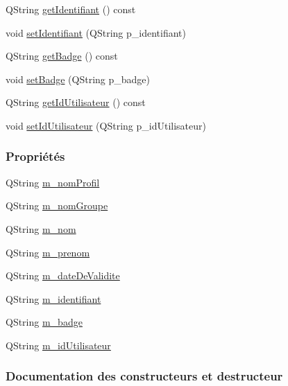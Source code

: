 \begin{DoxyCompactItemize}
\item 
Q\+String \hyperlink{class_utilisateur_armoire_a1ba08f24dedbe82671ae4e2930748f31}{get\+Identifiant} () const
\item 
void \hyperlink{class_utilisateur_armoire_ad1ebf69b10f99b062631a92a3f0ebd2b}{set\+Identifiant} (Q\+String p\+\_\+identifiant)
\item 
Q\+String \hyperlink{class_utilisateur_armoire_a22e301861ac1c932d47727ae02a17181}{get\+Badge} () const
\item 
void \hyperlink{class_utilisateur_armoire_afee7add8e43ae142c815f0d14491b01e}{set\+Badge} (Q\+String p\+\_\+badge)
\item 
Q\+String \hyperlink{class_utilisateur_armoire_a6a37ddd972e4de9db1cf3b4caa1d1755}{get\+Id\+Utilisateur} () const
\item 
void \hyperlink{class_utilisateur_armoire_a51fa6e41f395f6bbe1c3b763eaa93dee}{set\+Id\+Utilisateur} (Q\+String p\+\_\+id\+Utilisateur)
\end{DoxyCompactItemize}
\subsubsection*{Propriétés}
\begin{DoxyCompactItemize}
\item 
Q\+String \hyperlink{class_utilisateur_armoire_a470f47c105d9b3124c8d284b164a443d}{m\+\_\+nom\+Profil}
\item 
Q\+String \hyperlink{class_utilisateur_armoire_a6cf08d0dafdc9111d34f34a47c78b373}{m\+\_\+nom\+Groupe}
\item 
Q\+String \hyperlink{class_utilisateur_armoire_a39e1227fe3c7d726b161acab6a5c3434}{m\+\_\+nom}
\item 
Q\+String \hyperlink{class_utilisateur_armoire_a652d7a57ec09963d16ab82838a5ffc51}{m\+\_\+prenom}
\item 
Q\+String \hyperlink{class_utilisateur_armoire_a51bd81c78d69ea2699373d820bae31e4}{m\+\_\+date\+De\+Validite}
\item 
Q\+String \hyperlink{class_utilisateur_armoire_a30cb02e16dd9085a70c6b436781bb756}{m\+\_\+identifiant}
\item 
Q\+String \hyperlink{class_utilisateur_armoire_a1a3170a83da04d9f49816a98b226baeb}{m\+\_\+badge}
\item 
Q\+String \hyperlink{class_utilisateur_armoire_a7e3072a1a336d5ee1cf87c81d27b11e0}{m\+\_\+id\+Utilisateur}
\end{DoxyCompactItemize}


\subsubsection{Documentation des constructeurs et destructeur}
\mbox{\label{class_utilisateur_armoire_af2e72a14da4052a25ad02fd5876970a4}} 
